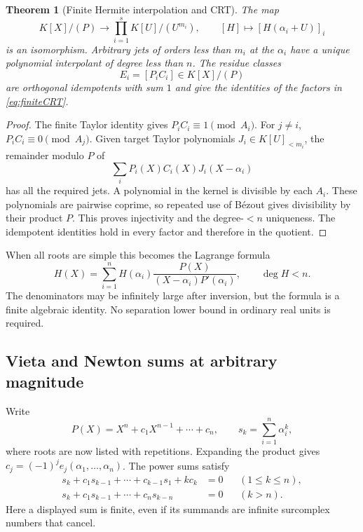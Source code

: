 \documentclass[11pt,letterpaper]{article}
\numberwithin{equation}{section}
\newtheorem{theorem}{Theorem}[section]
\theoremstyle{definition}
\theoremstyle{remark}
\begin{document}
\begin{theorem}[Finite Hermite interpolation and CRT]\label{thm:CRT}
The map
\begin{equation}\label{eq:finiteCRT}
 K[X]/(P)\longrightarrow\prod_{i=1}^s K[U]/(U^{m_i}),
 \qquad [H]\longmapsto[H(\alpha_i+U)]_i
\end{equation}
is an isomorphism. Arbitrary jets of orders less than $m_i$ at the
$\alpha_i$ have a unique polynomial interpolant of degree less than $n$.
The residue classes
\[
 E_i=[P_iC_i]\in K[X]/(P)
\]
are orthogonal idempotents with sum $1$ and give the identities of the
factors in \eqref{eq:finiteCRT}.
\end{theorem}
\begin{proof}
The finite Taylor identity gives $P_iC_i\equiv1\pmod{A_i}$. For $j\ne i$,
$P_iC_i\equiv0\pmod{A_j}$. Given target Taylor polynomials
$J_i\in K[U]_{<m_i}$, the remainder modulo $P$ of
\[
 \sum_i P_i(X)C_i(X)J_i(X-\alpha_i)
\]
has all the required jets. A polynomial in the kernel is divisible by
each $A_i$. These polynomials are pairwise coprime, so repeated use of
B\'ezout gives divisibility by their product $P$. This proves injectivity
and the degree-$<n$ uniqueness. The idempotent identities hold in every
factor and therefore in the quotient.
\end{proof}

When all roots are simple this becomes the Lagrange formula
\begin{equation}\label{eq:lagrange}
 H(X)=\sum_{i=1}^n H(\alpha_i)
 \frac{P(X)}{(X-\alpha_i)P'(\alpha_i)},\qquad \deg H<n.
\end{equation}
The denominators may be infinitely large after inversion, but the formula
is a finite algebraic identity. No separation lower bound in ordinary
real units is required.

\subsection{Vieta and Newton sums at arbitrary magnitude}
Write
\[
 P(X)=X^n+c_1X^{n-1}+\cdots+c_n,
 \qquad s_k=\sum_{i=1}^n\alpha_i^k,
\]
where roots are now listed with repetitions. Expanding the product gives
$c_j=(-1)^j e_j(\alpha_1,\ldots,\alpha_n)$. The power sums satisfy
\begin{align}
 s_k+c_1s_{k-1}+\cdots+c_{k-1}s_1+kc_k&=0 &&(1\le k\le n),\label{eq:newton1}\\
 s_k+c_1s_{k-1}+\cdots+c_ns_{k-n}&=0 &&(k>n).\label{eq:newton2}
\end{align}
Here a displayed sum is finite, even if its summands are infinite
surcomplex numbers that cancel.
\end{document}
